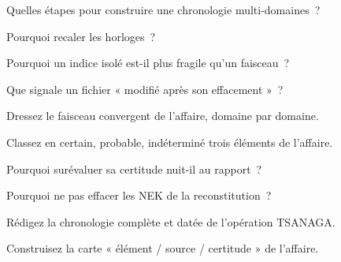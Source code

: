 \begin{boxexo}[title={\ding{45}\quad Exercice~17.1. Chronologie \niveaubase}]
Quelles étapes pour construire une chronologie multi-domaines~?
\end{boxexo}

\begin{boxexo}[title={\ding{45}\quad Exercice~17.2. Recaler \niveaubase}]
Pourquoi recaler les horloges~?
\end{boxexo}

\begin{boxexo}[title={\ding{45}\quad Exercice~17.3. Faisceau \niveaubase}]
Pourquoi un indice isolé est-il plus fragile qu'un faisceau~?
\end{boxexo}

\begin{boxexo}[title={\ding{45}\quad Exercice~17.4. Incohérence \niveaumoyen}]
Que signale un fichier « modifié après son effacement »~?
\end{boxexo}

\begin{boxexo}[title={\ding{45}\quad Exercice~17.5. TSANAGA \niveaumoyen}]
Dressez le faisceau convergent de l'affaire, domaine par domaine.
\end{boxexo}

\begin{boxexo}[title={\ding{45}\quad Exercice~17.6. Certitude \niveaumoyen}]
Classez en certain, probable, indéterminé trois éléments de l'affaire.
\end{boxexo}

\begin{boxexo}[title={\ding{45}\quad Exercice~17.7. Surévaluer \niveaumoyen}]
Pourquoi surévaluer sa certitude nuit-il au rapport~?
\end{boxexo}

\begin{boxexo}[title={\ding{45}\quad Exercice~17.8. NEK \niveaumoyen}]
Pourquoi ne pas effacer les NEK de la reconstitution~?
\end{boxexo}

\begin{boxexo}[title={\ding{45}\quad Exercice~17.9. Chronologie complète \niveauexpert}]
Rédigez la chronologie complète et datée de l'opération TSANAGA.
\end{boxexo}

\begin{boxexo}[title={\ding{45}\quad Exercice~17.10. Carte de certitude \niveauexpert}]
Construisez la carte « élément / source / certitude » de l'affaire.
\end{boxexo}

